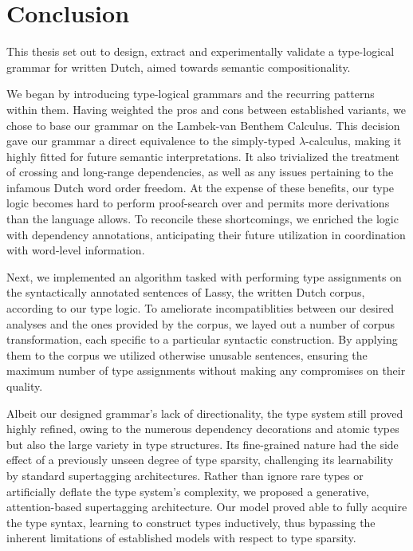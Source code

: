 \chapter{Conclusion}
\label{chapter:conclusion}
This thesis set out to design, extract and experimentally validate a type-logical grammar for written Dutch, aimed towards semantic compositionality.

We began by introducing type-logical grammars and the recurring patterns within them.
Having weighted the pros and cons between established variants, we chose to base our grammar on the Lambek-van Benthem Calculus.
This decision gave our grammar a direct equivalence to the simply-typed $\lambda$-calculus, making it highly fitted for future semantic interpretations.
It also trivialized the treatment of crossing and long-range dependencies, as well as any issues pertaining to the infamous Dutch word order freedom.
At the expense of these benefits, our type logic becomes hard to perform proof-search over and permits more derivations than the language allows.
To reconcile these shortcomings, we enriched the logic with dependency annotations, anticipating their future utilization in coordination with word-level information.

Next, we implemented an algorithm tasked with performing type assignments on the syntactically annotated sentences of Lassy, the written Dutch corpus, according to our type logic.
To ameliorate incompatiblities between our desired analyses and the ones provided by the corpus, we layed out a number of corpus transformation, each specific to a particular syntactic construction.
By applying them to the corpus we utilized otherwise unusable sentences, ensuring the maximum number of type assignments without making any compromises on their quality.

Albeit our designed grammar's lack of directionality, the type system still proved highly refined, owing to the numerous dependency decorations and atomic types but also the large variety in type structures.
Its fine-grained nature had the side effect of a previously unseen degree of type sparsity, challenging its learnability by standard supertagging architectures.
Rather than ignore rare types or artificially deflate the type system's complexity, we proposed a generative, attention-based supertagging architecture.
Our model proved able to fully acquire the type syntax, learning to construct types inductively, thus bypassing the inherent limitations of established models with respect to type sparsity.

